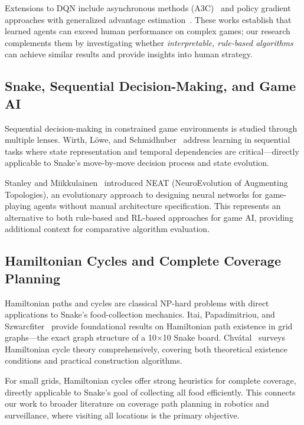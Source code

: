 \documentclass[a4paper]{article}
\begin{document}
Extensions to DQN include asynchronous methods (A3C)~\cite{Silverman2016} and policy gradient approaches with generalized advantage estimation~\cite{Schulman2016}. These works establish that learned agents can exceed human performance on complex games; our research complements them by investigating whether \textit{interpretable, rule-based algorithms} can achieve similar results and provide insights into human strategy.

\subsection{Snake, Sequential Decision-Making, and Game AI}

Sequential decision-making in constrained game environments is studied through multiple lenses. Wirth, Löwe, and Schmidhuber~\cite{Wirth2016} address learning in sequential tasks where state representation and temporal dependencies are critical—directly applicable to Snake's move-by-move decision process and state evolution.

Stanley and Miikkulainen~\cite{Stanley2002} introduced NEAT (NeuroEvolution of Augmenting Topologies), an evolutionary approach to designing neural networks for game-playing agents without manual architecture specification. This represents an alternative to both rule-based and RL-based approaches for game AI, providing additional context for comparative algorithm evaluation.

\subsection{Hamiltonian Cycles and Complete Coverage Planning}

Hamiltonian paths and cycles are classical NP-hard problems with direct applications to Snake's food-collection mechanics. Itai, Papadimitriou, and Szwarcfiter~\cite{Itai1982} provide foundational results on Hamiltonian path existence in grid graphs—the exact graph structure of a 10×10 Snake board. Chvátal~\cite{Chvatal1985} surveys Hamiltonian cycle theory comprehensively, covering both theoretical existence conditions and practical construction algorithms.

For small grids, Hamiltonian cycles offer strong heuristics for complete coverage, directly applicable to Snake's goal of collecting all food efficiently. This connects our work to broader literature on coverage path planning in robotics and surveillance, where visiting all locations is the primary objective.
\end{document}
